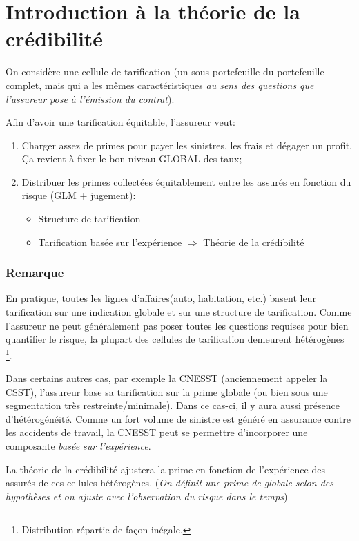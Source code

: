 \chapter{Introduction à la théorie de la crédibilité}
\label{chap:1:intro}

On considère une cellule de tarification (un sous-portefeuille du portefeuille complet, mais qui a les mêmes caractéristiques \textit{au sens des questions que l'assureur pose à l'émission du contrat}).

Afin d'avoir une tarification équitable, l'assureur veut:
\begin{enumerate}
\item Charger assez de primes pour payer les sinistres, les frais et dégager un profit. Ça revient à fixer le bon niveau GLOBAL des taux;
\item Distribuer les primes collectées équitablement entre les assurés en fonction du risque (GLM + jugement):
	\begin{itemize}
	\item Structure de tarification
	\item Tarification basée sur l'expérience $\Rightarrow$ Théorie de la crédibilité
	\end{itemize}	 
\end{enumerate}

\subsection*{Remarque}
En pratique, toutes les lignes d'affaires(auto, habitation, etc.) basent leur tarification sur une indication globale et sur une structure de tarification. 
Comme l'assureur ne peut généralement pas poser toutes les questions requises pour bien quantifier le risque, la plupart des cellules de tarification demeurent hétérogènes \footnote{Distribution répartie de façon inégale.}. 

Dans certains autres cas, par exemple la CNESST (anciennement appeler la CSST), l'assureur base sa tarification sur la prime globale (ou bien sous une segmentation très restreinte/minimale). Dans ce cas-ci, il y aura aussi présence d'hétérogénéité. Comme un fort volume de sinistre est généré en assurance contre les accidents de travail, la CNESST peut se permettre d'incorporer une composante \emph{basée sur l'expérience}.

La théorie de la crédibilité ajustera la prime en fonction de l'expérience des assurés de ces cellules hétérogènes. (\textit{On définit une prime de globale selon des hypothèses et on ajuste avec l'observation du risque dans le temps})

